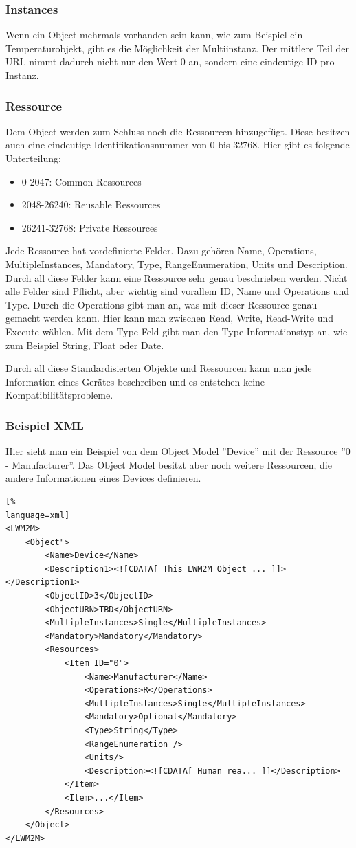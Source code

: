 \subsubsection{Instances}
Wenn ein Object mehrmals vorhanden sein kann, wie zum Beispiel ein Temperaturobjekt, gibt es die Möglichkeit der Multiinstanz. Der mittlere Teil der URL nimmt dadurch nicht nur den Wert 0 an, sondern eine eindeutige ID pro Instanz.

\subsubsection{Ressource}
Dem Object werden zum Schluss noch die Ressourcen hinzugefügt. Diese besitzen auch eine eindeutige Identifikationsnummer von 0 bis 32768. Hier gibt es folgende Unterteilung:
\begin{itemize}
\item 0-2047: Common Ressources
\item 2048-26240: Reusable Ressources
\item 26241-32768: Private Ressources
\end{itemize}
Jede Ressource hat vordefinierte Felder. Dazu gehören Name, Operations, MultipleInstances, Mandatory, Type, RangeEnumeration, Units und Description. Durch all diese Felder kann eine Ressource sehr genau beschrieben werden. Nicht alle Felder sind Pflicht, aber wichtig sind vorallem ID, Name und Operations und Type. Durch die Operations gibt man an, was mit dieser Ressource genau gemacht werden kann. Hier kann man zwischen Read, Write, Read-Write und Execute wählen.	Mit dem Type Feld gibt man den Type Informationstyp an, wie zum Beispiel String, Float oder Date.


Durch all diese Standardisierten Objekte und Ressourcen kann man jede Information eines Gerätes beschreiben und es entstehen keine Kompatibilitätsprobleme.
\subsubsection{Beispiel XML}
Hier sieht man ein Beispiel von dem Object Model ''Device'' mit der Ressource ''0 - Manufacturer''. Das Object Model besitzt aber noch weitere Ressourcen, die andere Informationen eines Devices definieren.
\begin{lstlisting}[%
language=xml]
<LWM2M>
	<Object">
		<Name>Device</Name>
		<Description1><![CDATA[ This LWM2M Object ... ]]></Description1>
		<ObjectID>3</ObjectID>
		<ObjectURN>TBD</ObjectURN>
		<MultipleInstances>Single</MultipleInstances>
		<Mandatory>Mandatory</Mandatory>
		<Resources>
			<Item ID="0">
				<Name>Manufacturer</Name>
				<Operations>R</Operations>
				<MultipleInstances>Single</MultipleInstances>
				<Mandatory>Optional</Mandatory>
				<Type>String</Type>
				<RangeEnumeration />
				<Units/>
				<Description><![CDATA[ Human rea... ]]</Description>
			</Item>
			<Item>...</Item>
		</Resources>
	</Object>
</LWM2M>
\end{lstlisting}

